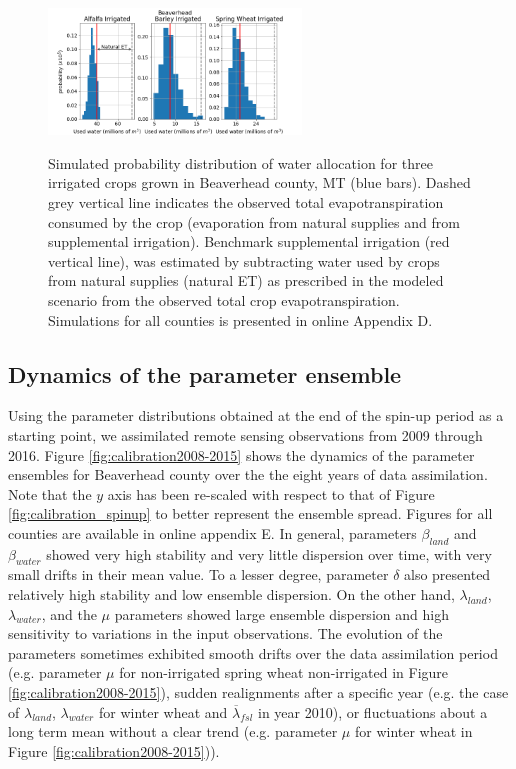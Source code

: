 \begin{figure}
\includegraphics[width=0.6\textwidth]{Figures/30001obs_water_hist_2008.png}
\label{fig:hist_water_alloc}
\caption{Simulated probability distribution of water allocation for three irrigated crops grown in Beaverhead county, MT (blue bars). Dashed grey vertical line indicates the observed total evapotranspiration consumed by the crop (evaporation from natural supplies and from supplemental irrigation). Benchmark supplemental irrigation (red vertical line), was estimated by subtracting water used by crops from natural supplies  (natural ET) as prescribed in the modeled scenario from the observed total crop evapotranspiration. Simulations for all counties is presented in online Appendix D.}
\end{figure}

\subsection{Dynamics of the parameter ensemble}

Using the parameter distributions obtained at the end of the spin-up period as a starting point, we assimilated remote sensing observations from 2009 through 2016. Figure \ref{fig:calibration2008-2015} shows the dynamics of the parameter ensembles for Beaverhead county over the the eight years of data assimilation. Note that the $y$ axis has been re-scaled with respect to that of Figure \ref{fig:calibration_spinup} to better represent the ensemble spread. Figures for all counties are available in online appendix E. In general, parameters $\beta_{land}$ and $\beta_{water}$ showed very high stability and very little dispersion over time, with very small drifts in their mean value. To a lesser degree, parameter $\delta$ also presented relatively high stability and low ensemble dispersion. On the other hand, $\lambda_{land}$, $\lambda_{water}$, and the $\mu$ parameters showed large ensemble dispersion and high sensitivity to variations in the input observations. The evolution of the parameters sometimes exhibited smooth drifts over the data assimilation period (e.g. parameter $\mu$ for non-irrigated spring wheat non-irrigated in Figure \ref{fig:calibration2008-2015}), sudden realignments after a specific year (e.g. the case of $\lambda_{land}$, $\lambda_{water}$ for winter wheat and $\overline{\lambda}_{fsl}$ in year 2010), or fluctuations about a long term mean without a clear trend (e.g. parameter $\mu$ for winter wheat in Figure \ref{fig:calibration2008-2015})).


